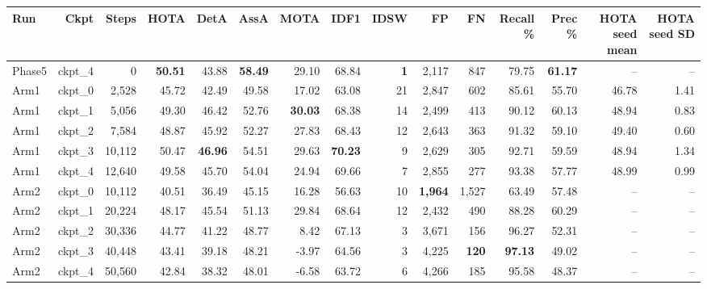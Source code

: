 \begin{tabular}{lrrrrrrrrrrrrrr}
\toprule
Run & Ckpt & Steps & HOTA & DetA & AssA & MOTA & IDF1 & IDSW & FP & FN & Recall \% & Prec \% & HOTA seed mean & HOTA seed SD \\
\midrule
Phase5 & ckpt\_4 & 0 & \textbf{50.51} & 43.88 & \textbf{58.49} & 29.10 & 68.84 & \textbf{1} & 2,117 & 847 & 79.75 & \textbf{61.17} & -- & -- \\
Arm1 & ckpt\_0 & 2,528 & 45.72 & 42.49 & 49.58 & 17.02 & 63.08 & 21 & 2,847 & 602 & 85.61 & 55.70 & 46.78 & 1.41 \\
Arm1 & ckpt\_1 & 5,056 & 49.30 & 46.42 & 52.76 & \textbf{30.03} & 68.38 & 14 & 2,499 & 413 & 90.12 & 60.13 & 48.94 & 0.83 \\
Arm1 & ckpt\_2 & 7,584 & 48.87 & 45.92 & 52.27 & 27.83 & 68.43 & 12 & 2,643 & 363 & 91.32 & 59.10 & 49.40 & 0.60 \\
Arm1 & ckpt\_3 & 10,112 & 50.47 & \textbf{46.96} & 54.51 & 29.63 & \textbf{70.23} & 9 & 2,629 & 305 & 92.71 & 59.59 & 48.94 & 1.34 \\
Arm1 & ckpt\_4 & 12,640 & 49.58 & 45.70 & 54.04 & 24.94 & 69.66 & 7 & 2,855 & 277 & 93.38 & 57.77 & 48.99 & 0.99 \\
Arm2 & ckpt\_0 & 10,112 & 40.51 & 36.49 & 45.15 & 16.28 & 56.63 & 10 & \textbf{1,964} & 1,527 & 63.49 & 57.48 & -- & -- \\
Arm2 & ckpt\_1 & 20,224 & 48.17 & 45.54 & 51.13 & 29.84 & 68.64 & 12 & 2,432 & 490 & 88.28 & 60.29 & -- & -- \\
Arm2 & ckpt\_2 & 30,336 & 44.77 & 41.22 & 48.77 & 8.42 & 67.13 & 3 & 3,671 & 156 & 96.27 & 52.31 & -- & -- \\
Arm2 & ckpt\_3 & 40,448 & 43.41 & 39.18 & 48.21 & -3.97 & 64.56 & 3 & 4,225 & \textbf{120} & \textbf{97.13} & 49.02 & -- & -- \\
Arm2 & ckpt\_4 & 50,560 & 42.84 & 38.32 & 48.01 & -6.58 & 63.72 & 6 & 4,266 & 185 & 95.58 & 48.37 & -- & -- \\
\bottomrule
\end{tabular}

